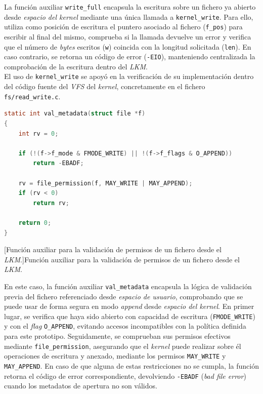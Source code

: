 La función auxiliar \verb|write_full| encapsula la escritura sobre un fichero ya abierto desde \textit{espacio del kernel} mediante una única llamada a \verb|kernel_write|.
Para ello, utiliza como posición de escritura el puntero asociado al fichero (\verb|f_pos|) para escribir al final del mismo, comprueba si la llamada devuelve un error y verifica que el número de \textit{bytes} escritos (\verb|w|) coincida con la longitud solicitada (\verb|len|).
En caso contrario, se retorna un código de error (\texttt{-EIO}), manteniendo centralizada la comprobación de la escritura dentro del \textit{LKM}.\\

El uso de \verb|kernel_write| se apoyó en la verificación de su implementación dentro del código fuente del \textit{VFS} del \textit{kernel}, concretamente en el fichero \texttt{fs/read\_write.c}.\\

\begin{lstlisting}[language=C]
static int val_metadata(struct file *f)
{
    int rv = 0;

    if (!(f->f_mode & FMODE_WRITE) || !(f->f_flags & O_APPEND))
        return -EBADF;

    rv = file_permission(f, MAY_WRITE | MAY_APPEND);
    if (rv < 0)
        return rv;

    return 0;
}
\end{lstlisting}
\captionsetup{type=code,justification=centering,singlelinecheck=false}
[Función auxiliar para la validación de permisos de un fichero desde el \textit{LKM}.]{Función auxiliar para la validación de permisos de un fichero desde el \textit{LKM}.}
\label{cod:file_handoff_val_metadata}
\vspace{\baselineskip}

En este caso, la función auxiliar \verb|val_metadata| encapsula la lógica de validación previa del fichero referenciado desde \textit{espacio de usuario}, comprobando que se puede usar de forma segura en modo \textit{append} desde \textit{espacio del kernel}.
En primer lugar, se verifica que haya sido abierto con capacidad de escritura (\verb|FMODE_WRITE|) y con el \textit{flag} \verb|O_APPEND|, evitando accesos incompatibles con la política definida para este prototipo.
Seguidamente, se comprueban sus permisos efectivos mediante \verb|file_permission|, asegurando que el \textit{kernel} puede realizar sobre él operaciones de escritura y anexado, mediante los permisos \verb|MAY_WRITE| y \verb|MAY_APPEND|.
En caso de que alguna de estas restricciones no se cumpla, la función retorna el código de error correspondiente, devolviendo \texttt{-EBADF} (\textit{bad file error}) cuando los metadatos de apertura no son válidos.\\

